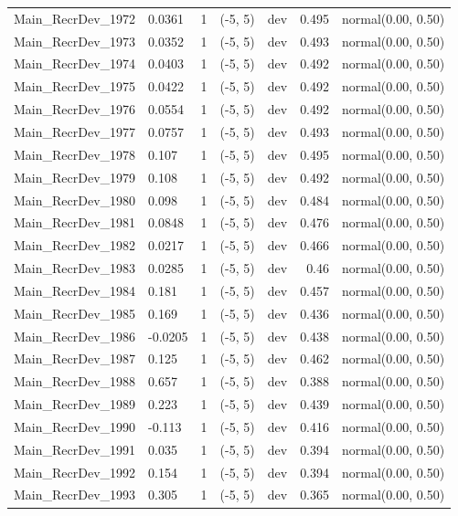 \documentclass[
]{scrartcl}
\begin{document}
\begin{longtable}{llrllrl}
Main\_RecrDev\_1972 & 0.0361 & 1 & (-5, 5) & dev & 0.495 & normal(0.00, 0.50) \\ 
Main\_RecrDev\_1973 & 0.0352 & 1 & (-5, 5) & dev & 0.493 & normal(0.00, 0.50) \\ 
Main\_RecrDev\_1974 & 0.0403 & 1 & (-5, 5) & dev & 0.492 & normal(0.00, 0.50) \\ 
Main\_RecrDev\_1975 & 0.0422 & 1 & (-5, 5) & dev & 0.492 & normal(0.00, 0.50) \\ 
Main\_RecrDev\_1976 & 0.0554 & 1 & (-5, 5) & dev & 0.492 & normal(0.00, 0.50) \\ 
Main\_RecrDev\_1977 & 0.0757 & 1 & (-5, 5) & dev & 0.493 & normal(0.00, 0.50) \\ 
Main\_RecrDev\_1978 & 0.107 & 1 & (-5, 5) & dev & 0.495 & normal(0.00, 0.50) \\ 
Main\_RecrDev\_1979 & 0.108 & 1 & (-5, 5) & dev & 0.492 & normal(0.00, 0.50) \\ 
Main\_RecrDev\_1980 & 0.098 & 1 & (-5, 5) & dev & 0.484 & normal(0.00, 0.50) \\ 
Main\_RecrDev\_1981 & 0.0848 & 1 & (-5, 5) & dev & 0.476 & normal(0.00, 0.50) \\ 
Main\_RecrDev\_1982 & 0.0217 & 1 & (-5, 5) & dev & 0.466 & normal(0.00, 0.50) \\ 
Main\_RecrDev\_1983 & 0.0285 & 1 & (-5, 5) & dev & 0.46 & normal(0.00, 0.50) \\ 
Main\_RecrDev\_1984 & 0.181 & 1 & (-5, 5) & dev & 0.457 & normal(0.00, 0.50) \\ 
Main\_RecrDev\_1985 & 0.169 & 1 & (-5, 5) & dev & 0.436 & normal(0.00, 0.50) \\ 
Main\_RecrDev\_1986 & -0.0205 & 1 & (-5, 5) & dev & 0.438 & normal(0.00, 0.50) \\ 
Main\_RecrDev\_1987 & 0.125 & 1 & (-5, 5) & dev & 0.462 & normal(0.00, 0.50) \\ 
Main\_RecrDev\_1988 & 0.657 & 1 & (-5, 5) & dev & 0.388 & normal(0.00, 0.50) \\ 
Main\_RecrDev\_1989 & 0.223 & 1 & (-5, 5) & dev & 0.439 & normal(0.00, 0.50) \\ 
Main\_RecrDev\_1990 & -0.113 & 1 & (-5, 5) & dev & 0.416 & normal(0.00, 0.50) \\ 
Main\_RecrDev\_1991 & 0.035 & 1 & (-5, 5) & dev & 0.394 & normal(0.00, 0.50) \\ 
Main\_RecrDev\_1992 & 0.154 & 1 & (-5, 5) & dev & 0.394 & normal(0.00, 0.50) \\ 
Main\_RecrDev\_1993 & 0.305 & 1 & (-5, 5) & dev & 0.365 & normal(0.00, 0.50) \\ 

\end{longtable}
\end{document}
